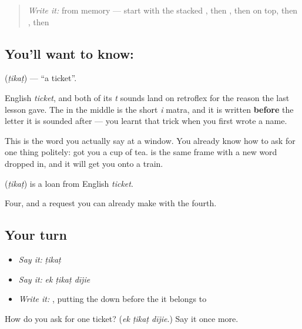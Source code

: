 \label{lesson:HI-C69-ticket}



\begin{quote}
\emph{Write it:} \textbf{} from memory — start with the stacked , then , then  on top, then , then 
\end{quote}

\subsection*{You'll want to know: }
\textbf{} (\emph{ṭikaṭ}) — \textquotedblleft{}a ticket\textquotedblright{}.

English \emph{ticket}, and both of its \emph{t} sounds land on retroflex  for the reason the last lesson gave. The  in the middle is the short \emph{i} matra, and it is written \textbf{before} the letter it is sounded after — you learnt that trick when you first wrote a name.

This is the word you actually say at a window. You already know how to ask for one thing politely: \textbf{  } got you a cup of tea. \textbf{  } is the same frame with a new word dropped in, and it will get you onto a train.

\begin{cousinweb}
\textbf{} (\emph{ṭikaṭ}) is a loan from English \emph{ticket}.
\end{cousinweb}

\begin{grammarlens}[title={What you've built}]
Four, and a request you can already make with the fourth.
\end{grammarlens}

\subsection*{Your turn}
\begin{itemize}
\raggedright
  \item \emph{Say it:} \emph{ṭikaṭ}
  \item \emph{Say it:} \emph{ek ṭikaṭ dījie}
  \item \emph{Write it:} , putting the  down before the  it belongs to
\end{itemize}

\begin{tcolorbox}[breakable,colback=teal!4,colframe=teal!35!black,title={Before you move on}]
How do you ask for one ticket? (\emph{ek ṭikaṭ dījie}.) Say it once more.
\end{tcolorbox}
